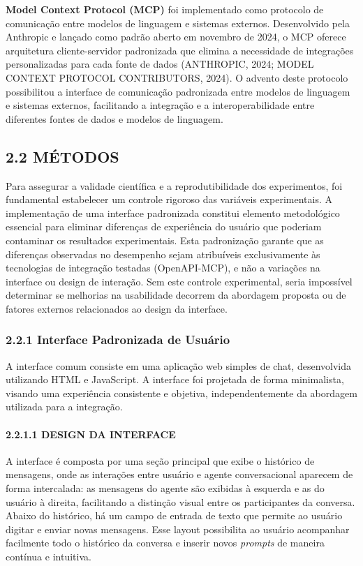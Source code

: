 \documentclass[
]{article}
\begin{document}
\textbf{Model Context Protocol (MCP)} foi implementado como protocolo de
comunicação entre modelos de linguagem e sistemas externos. Desenvolvido
pela Anthropic e lançado como padrão aberto em novembro de 2024, o MCP
oferece arquitetura cliente-servidor padronizada que elimina a
necessidade de integrações personalizadas para cada fonte de dados
(ANTHROPIC, 2024; MODEL CONTEXT PROTOCOL CONTRIBUTORS, 2024). O advento
deste protocolo possibilitou a interface de comunicação padronizada
entre modelos de linguagem e sistemas externos, facilitando a integração
e a interoperabilidade entre diferentes fontes de dados e modelos de
linguagem.

\subsection{2.2 MÉTODOS}\label{muxe9todos}

Para assegurar a validade científica e a reprodutibilidade dos
experimentos, foi fundamental estabelecer um controle rigoroso das
variáveis experimentais. A implementação de uma interface padronizada
constitui elemento metodológico essencial para eliminar diferenças de
experiência do usuário que poderiam contaminar os resultados
experimentais. Esta padronização garante que as diferenças observadas no
desempenho sejam atribuíveis exclusivamente às tecnologias de integração
testadas (OpenAPI-MCP), e não a variações na interface ou design de
interação. Sem este controle experimental, seria impossível determinar
se melhorias na usabilidade decorrem da abordagem proposta ou de fatores
externos relacionados ao design da interface.

\subsubsection{2.2.1 Interface Padronizada de
Usuário}\label{interface-padronizada-de-usuuxe1rio}

A interface comum consiste em uma aplicação web simples de chat,
desenvolvida utilizando HTML e JavaScript. A interface foi projetada de
forma minimalista, visando uma experiência consistente e objetiva,
independentemente da abordagem utilizada para a integração.

\paragraph{2.2.1.1 DESIGN DA INTERFACE}\label{design-da-interface}

A interface é composta por uma seção principal que exibe o histórico de
mensagens, onde as interações entre usuário e agente conversacional
aparecem de forma intercalada: as mensagens do agente são exibidas à
esquerda e as do usuário à direita, facilitando a distinção visual entre
os participantes da conversa. Abaixo do histórico, há um campo de
entrada de texto que permite ao usuário digitar e enviar novas
mensagens. Esse layout possibilita ao usuário acompanhar facilmente todo
o histórico da conversa e inserir novos \emph{prompts} de maneira
contínua e intuitiva.
\end{document}
